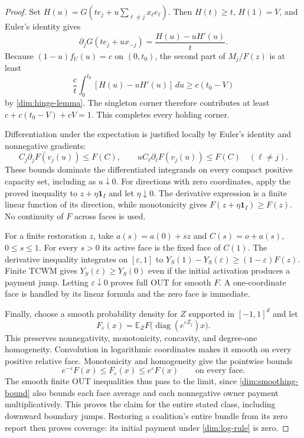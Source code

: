 \documentclass[11pt]{article}
\newcommand{\E}{\mathbb E}
\theoremstyle{definition}\newtheorem{definition}[theorem]{Definition}
\theoremstyle{remark}\newtheorem{remark}[theorem]{Remark}
\begin{document}
\begin{proof}
Set $H(u)=G(te_j+u\sum_{\ell\ne j}x_\ell e_\ell)$.
Then $H(t)\ge t$, $H(1)=V$, and Euler's identity gives
\[
 \partial_jG(te_j+u x_{-j})
 =\frac{H(u)-uH'(u)}{t}.
\]
Because $(1-u)f_U(u)=c$ on $(0,t_0)$, the second part of $M_j/F(z)$
is at least
\[
 \frac{c}{t}\int_0^{t_0}[H(u)-uH'(u)]\,du
 \ge c(t_0-V)
\]
by \eqref{dim:hinge-lemma}. The singleton corner therefore contributes at
least $c+c(t_0-V)+cV=1$. This completes every holding corner.

Differentiation under the expectation is justified locally by Euler's
identity and nonnegative gradients:
\[
 C_j\partial_jF(v_j(u))\le F(C),\qquad
 uC_\ell\partial_\ell F(v_j(u))\le F(C)\quad(\ell\ne j).
\]
These bounds dominate the differentiated integrands on every compact
positive capacity set, including as $u\downarrow0$.
For directions with zero coordinates, apply the proved inequality to
$z+\eta\mathbf1_I$ and let $\eta\downarrow0$. The derivative expression
is a finite linear function of its direction, while monotonicity gives
$F(z+\eta\mathbf1_I)\ge F(z)$. No continuity of $F$ across faces is used.

For a finite restoration $z$, take $a(s)=a(0)+sz$ and
$C(s)=o+a(s)$, $0\le s\le1$. For every $s>0$ its active face is the
fixed face of $C(1)$. The derivative inequality integrates on
$[\varepsilon,1]$ to
$Y_S(1)-Y_S(\varepsilon)\ge(1-\varepsilon)F(z)$.
Finite TCWM gives $Y_S(\varepsilon)\ge Y_S(0)$ even if the initial
activation produces a payment jump. Letting $\varepsilon\downarrow0$
proves full OUT for smooth $F$. A one-coordinate face is handled by its
linear formula and the zero face is immediate.

Finally, choose a smooth probability density for $Z$ supported in
$[-1,1]^d$ and let
\[
 F_\varepsilon(x)=\E_Z
 F\bigl(\operatorname{diag}(e^{\varepsilon Z_j})x\bigr).
\]
This preserves nonnegativity, monotonicity, concavity, and degree-one
homogeneity. Convolution in logarithmic coordinates makes it smooth on
every positive relative face. Monotonicity and homogeneity give the
pointwise bounds
\begin{equation}\label{dim:smoothing-bound}
 e^{-\varepsilon}F(x)\le F_\varepsilon(x)
 \le e^\varepsilon F(x)
 \qquad\text{on every face.}
\end{equation}
The smooth finite OUT inequalities thus pass to the limit, since
\eqref{dim:smoothing-bound} also bounds each face average and each
nonnegative owner payment multiplicatively. This proves the claim for the
entire stated class, including downward boundary jumps.
Restoring a coalition's entire bundle from its zero report then proves
coverage: its initial payment under \eqref{dim:log-rule} is zero.
\end{proof}
\end{document}
